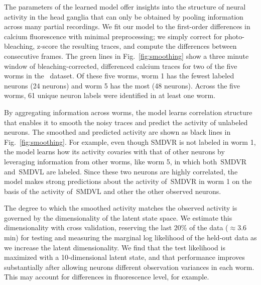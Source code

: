\documentclass[11pt]{article}
\begin{document}
The parameters of the learned model offer insights into the structure
of neural activity in the head ganglia that can only be obtained by
pooling information across many partial recordings.  We fit our model
to the first-order differences in calcium fluorescence with minimal
preprocessing; we simply correct for photo-bleaching, z-score the
resulting traces, and compute the differences between consecutive
frames. The green lines in Fig.~\ref{fig:smoothing} show a three
minute window of bleaching-corrected, differenced calcium traces for
two of the five worms in the~\citet{kato2015global} dataset. Of these
five worms, worm 1 has the fewest labeled neurons (24 neurons) and
worm 5 has the most (48 neurons). Across the five worms, 61 unique
neuron labels were identified in at least one worm.

By aggregating information across worms, the model learns correlation
structure that enables it to smooth the noisy traces and predict the
activity of unlabeled neurons.  The smoothed and predicted activity
are shown as black lines in Fig.~\ref{fig:smoothing}. For example,
even though \textsf{SMDVR} is not labeled in worm 1, the model
learns how its activity covaries with that of other neurons
by leveraging information from other worms, like worm 5, in which
both~\textsf{SMDVR} and~\textsf{SMDVL} are labeled.  Since these
two neurons are highly correlated, the model makes strong predictions
about the activity of~\textsf{SMDVR} in worm 1 on the basis of the
activity of~\textsf{SMDVL} and other the other observed neurons.

The degree to which the smoothed activity matches the observed
activity is governed by the dimensionality of the latent state space.
We estimate this dimensionality with cross validation, reserving the
last 20\% of the data ($\approx$3.6 min) for testing and measuring the
marginal log likelihood of the held-out data as we increase the latent
dimensionality. We find that the test likelihood is maximized with a
10-dimensional latent state, and that performance improves
substantially after allowing neurons different observation variances
in each worm. This may account for differences in fluorescence level,
for example.

 
\end{document}
